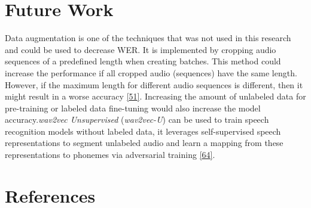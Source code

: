 \documentclass[
  a4paper,
]{article}
\begin{document}
\newpage

\hypertarget{future-work}{%
\section{Future Work}\label{future-work}}

Data augmentation is one of the techniques that was not used in this
research and could be used to decrease WER. It is implemented by
cropping audio sequences of a predefined length when creating batches.
This method could increase the performance if all cropped audio
(sequences) have the same length. However, if the maximum length for
different audio sequences is different, then it might result in a worse
accuracy \protect\hyperlink{ref-schneider2019wav2vec}{{[}51{]}}.
Increasing the amount of unlabeled data for pre-training or labeled data
fine-tuning would also increase the model accuracy.\emph{wav2vec
Unsupervised} (\emph{wav2vec-U}) can be used to train speech recognition
models without labeled data, it leverages self-supervised speech
representations to segment unlabeled audio and learn a mapping from
these representations to phonemes via adversarial training
\protect\hyperlink{ref-baevski2021unsupervised}{{[}64{]}}.

\newpage

\hypertarget{references}{%
\section{References}\label{references}}

\setlength{\parindent}{0pt}
\end{document}
